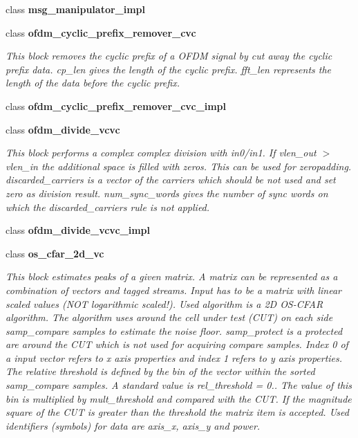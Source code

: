 \begin{DoxyCompactItemize}
class {\bf msg\+\_\+manipulator\+\_\+impl}
\item 
class {\bf ofdm\+\_\+cyclic\+\_\+prefix\+\_\+remover\+\_\+cvc}
\begin{DoxyCompactList}\small\item\em This block removes the cyclic prefix of a O\+F\+DM signal by cut away the cyclic prefix data. cp\+\_\+len gives the length of the cyclic prefix. fft\+\_\+len represents the length of the data before the cyclic prefix. \end{DoxyCompactList}\item 
class {\bf ofdm\+\_\+cyclic\+\_\+prefix\+\_\+remover\+\_\+cvc\+\_\+impl}
\item 
class {\bf ofdm\+\_\+divide\+\_\+vcvc}
\begin{DoxyCompactList}\small\item\em This block performs a complex complex division with in0/in1. If vlen\+\_\+out $>$ vlen\+\_\+in the additional space is filled with zeros. This can be used for zeropadding. discarded\+\_\+carriers is a vector of the carriers which should be not used and set zero as division result. num\+\_\+sync\+\_\+words gives the number of sync words on which the discarded\+\_\+carriers rule is not applied. \end{DoxyCompactList}\item 
class {\bf ofdm\+\_\+divide\+\_\+vcvc\+\_\+impl}
\item 
class {\bf os\+\_\+cfar\+\_\+2d\+\_\+vc}
\begin{DoxyCompactList}\small\item\em This block estimates peaks of a given matrix. A matrix can be represented as a combination of vectors and tagged streams. Input has to be a matrix with linear scaled values (N\+OT logarithmic scaled!). Used algorithm is a 2D O\+S-\/\+C\+F\+AR algorithm. The algorithm uses around the cell under test (C\+UT) on each side samp\+\_\+compare samples to estimate the noise floor. samp\+\_\+protect is a protected are around the C\+UT which is not used for acquiring compare samples. Index 0 of a input vector refers to x axis properties and index 1 refers to y axis properties. The relative threshold is defined by the bin of the vector within the sorted samp\+\_\+compare samples. A standard value is rel\+\_\+threshold = 0.. The value of this bin is multiplied by mult\+\_\+threshold and compared with the C\+UT. If the magnitude square of the C\+UT is greater than the threshold the matrix item is accepted. Used identifiers (symbols) for data are \textquotesingle{}axis\+\_\+x\textquotesingle{}, \textquotesingle{}axis\+\_\+y\textquotesingle{} and \textquotesingle{}power\textquotesingle{}. \end{DoxyCompactList}\item 

\end{DoxyCompactItemize}
